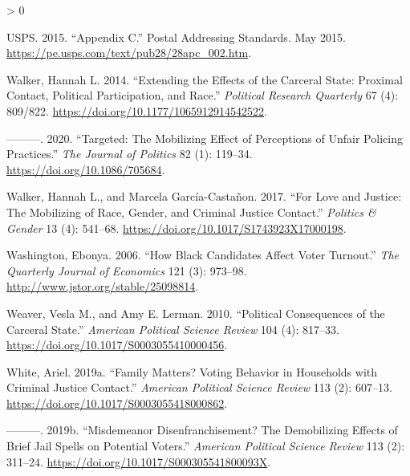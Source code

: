 \documentclass[
  12pt,
]{article}
\newlength{\cslhangindent}
\newenvironment{CSLReferences}[2] %
 {%
  \setlength{\parindent}{0pt}
  \ifodd #1 \everypar{\setlength{\hangindent}{\cslhangindent}}\ignorespaces\fi
  \ifnum #2 > 0
  \setlength{\parskip}{#2\baselineskip}
  \fi
 }%
 {}
\begin{document}
\begin{CSLReferences}{1}{0}
\leavevmode\hypertarget{ref-USPS2015}{}%
USPS. 2015. {``Appendix {C}.''} {Postal Addressing Standards}. May 2015. \url{https://pe.usps.com/text/pub28/28apc_002.htm}.

\leavevmode\hypertarget{ref-Walker2014}{}%
Walker, Hannah L. 2014. {``Extending the {Effects} of the {Carceral State}: {Proximal Contact}, {Political Participation}, and {Race}.''} \emph{Political Research Quarterly} 67 (4): 809/822. \url{https://doi.org/10.1177/1065912914542522}.

\leavevmode\hypertarget{ref-Walker2020}{}%
---------. 2020. {``Targeted: {The Mobilizing Effect} of {Perceptions} of {Unfair Policing Practices}.''} \emph{The Journal of Politics} 82 (1): 119--34. \url{https://doi.org/10.1086/705684}.

\leavevmode\hypertarget{ref-Walker2017}{}%
Walker, Hannah L., and Marcela García-Castañon. 2017. {``For {Love} and {Justice}: {The Mobilizing} of {Race}, {Gender}, and {Criminal Justice Contact}.''} \emph{Politics \& Gender} 13 (4): 541--68. \url{https://doi.org/10.1017/S1743923X17000198}.

\leavevmode\hypertarget{ref-Washington2006}{}%
Washington, Ebonya. 2006. {``How {Black Candidates Affect Voter Turnout}.''} \emph{The Quarterly Journal of Economics} 121 (3): 973--98. \url{http://www.jstor.org/stable/25098814}.

\leavevmode\hypertarget{ref-Weaver2010}{}%
Weaver, Vesla M., and Amy E. Lerman. 2010. {``Political {Consequences} of the {Carceral State}.''} \emph{American Political Science Review} 104 (4): 817--33. \url{https://doi.org/10.1017/S0003055410000456}.

\leavevmode\hypertarget{ref-White2019a}{}%
White, Ariel. 2019a. {``Family {Matters}? {Voting Behavior} in {Households} with {Criminal Justice Contact}.''} \emph{American Political Science Review} 113 (2): 607--13. \url{https://doi.org/10.1017/S0003055418000862}.

\leavevmode\hypertarget{ref-White2019}{}%
---------. 2019b. {``Misdemeanor {Disenfranchisement}? {The Demobilizing Effects} of {Brief Jail Spells} on {Potential Voters}.''} \emph{American Political Science Review} 113 (2): 311--24. \url{https://doi.org/10.1017/S000305541800093X}.

\end{CSLReferences}
\end{document}
